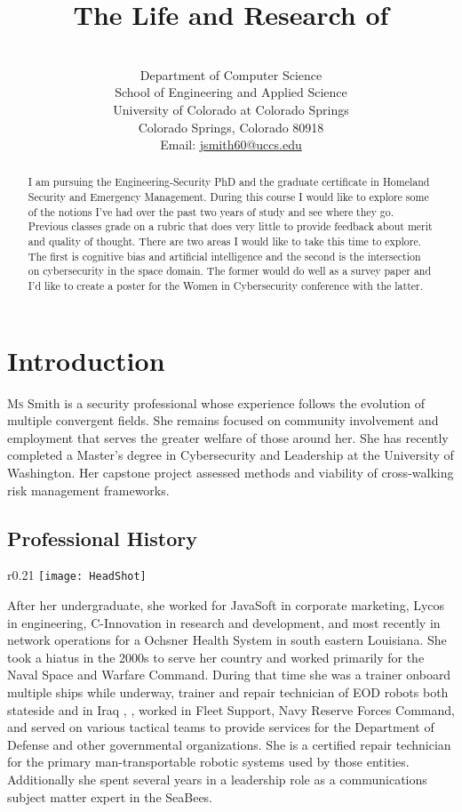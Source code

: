 \documentclass[journal]{IEEEtran}
\title{The Life and Research of \myname}
\author{\myname\\
Department of Computer Science\\School of Engineering and Applied Science\\University of Colorado at Colorado Springs\\Colorado Springs, Colorado 80918\\Email: \href{mailto:jsmith@uccs.edu}{jsmith60@uccs.edu}}
\newcommand{\myname}{Jennifer S. Smith}
\begin{document}
\maketitle
\begin{abstract}
I am pursuing the Engineering-Security PhD and the graduate certificate in Homeland Security and Emergency Management. During this course I would like to explore some of the notions I've had over the past two years of study and see where they go. Previous classes grade on a rubric that does very little to provide feedback about merit and quality of thought. There are two areas I would like to take this time to explore. The first is cognitive bias and artificial intelligence and the second is the intersection on cybersecurity in the space domain. The former would do well as a survey paper and I'd like to create a poster for the Women in Cybersecurity conference with the latter. 
\end{abstract}
\section{Introduction}
\lettrine{M}{s} Smith is a security professional whose experience follows the evolution of multiple convergent fields. She remains focused on community involvement and employment that serves the greater welfare of those around her. She has recently completed a Master's degree in Cybersecurity and Leadership at the University of Washington. Her capstone project assessed methods and viability of cross-walking risk management frameworks.
\subsection{Professional History}
\begin{wrapfigure}{r}{0.21\textwidth}%
\centering
\texttt{[image: HeadShot]}
\caption{\myname}
\end{wrapfigure}
After her undergraduate, she worked for JavaSoft in corporate marketing, Lycos in engineering, C-Innovation in research and development, and most recently in network operations for a Ochsner Health System in south eastern Louisiana. She took a hiatus in the 2000s to serve her country and worked primarily for the Naval Space and Warfare Command. During that time she was a trainer onboard multiple ships while underway, trainer and repair technician of EOD robots both stateside and in Iraq \cite{Everett}, \cite{Weiner}, worked in Fleet Support, Navy Reserve Forces Command, and served on various tactical teams to provide services for the Department of Defense and other governmental organizations. She is a certified repair technician for the primary man-transportable robotic systems used by those entities. Additionally she spent several years in a leadership role as a communications subject matter expert in the SeaBees.
\end{document}
